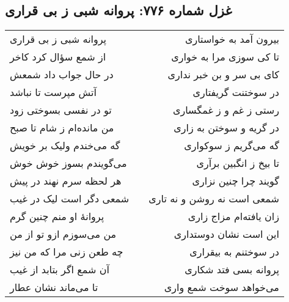 \begin{center}
\section*{غزل شماره ۷۷۶: پروانه شبی ز بی قراری}
\label{sec:776}
\begin{longtable}{l p{0.5cm} r}
پروانه شبی ز بی قراری
&&
بیرون آمد به خواستاری
\\
از شمع سؤال کرد کاخر
&&
تا کی سوزی مرا به خواری
\\
در حال جواب داد شمعش
&&
کای بی سر و بن خبر نداری
\\
آتش مپرست تا نباشد
&&
در سوختنت گریفتاری
\\
تو در نفسی بسوختی زود
&&
رستی ز غم و ز غمگساری
\\
من مانده‌ام ز شام تا صبح
&&
در گریه و سوختن به زاری
\\
گه می‌خندم ولیک بر خویش
&&
گه می‌گریم ز سوکواری
\\
می‌گویندم بسوز خوش خوش
&&
تا بیخ ز انگبین برآری
\\
هر لحظه سرم نهند در پیش
&&
گویند چرا چنین نزاری
\\
شمعی دگر است لیک در غیب
&&
شمعی است نه روشن و نه تاری
\\
پروانهٔ او منم چنین گرم
&&
زان یافته‌ام مزاج زاری
\\
من می‌سوزم ازو تو از من
&&
این است نشان دوستداری
\\
چه طعن زنی مرا که من نیز
&&
در سوختنم به بیقراری
\\
آن شمع اگر بتابد از غیب
&&
پروانه بسی فتد شکاری
\\
تا می‌ماند نشان عطار
&&
می‌خواهد سوخت شمع واری
\\
\end{longtable}
\end{center}
